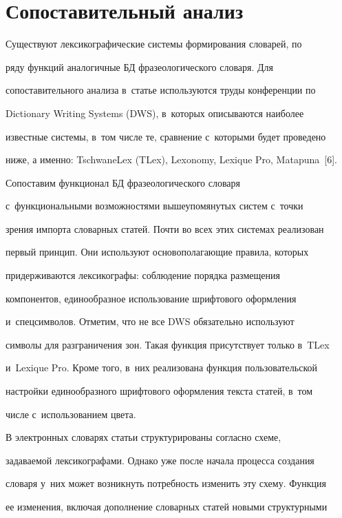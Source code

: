      

\section{Сопоставительный анализ}



   Существуют лексикографические системы формирования словарей, по 

ряду функций аналогичные БД фразеологического словаря. Для 

сопоставительного анализа в~статье используются труды конференции по 

Dictionary Writing Systems (DWS), в~которых описываются наиболее 

известные системы, в~том числе те, сравнение с~которыми будет проведено 

ниже, а именно: TschwaneLex (TLex), Lexonomy, Lexique Pro, Matapuna~[6]. 

   

   Сопоставим функционал БД фразеологического словаря 

с~функциональными возможностями вышеупомянутых систем с~точки 

зрения импорта словарных статей. Почти во всех этих системах реализован 

первый принцип. Они используют основополагающие правила, которых 

придерживаются лексикографы: соблюдение порядка размещения 

компонентов, единообразное использование шрифтового оформления 

и~спецсимволов. Отметим, что не все DWS обязательно используют 

символы для разграничения зон. Такая функция присутствует только в~TLex 

и~Lexique Pro. Кроме того, в~них реализована функция пользовательской 

настройки единообразного шрифтового оформления текста статей, в~том 

числе с~использованием цвета.

   

   В электронных словарях статьи структурированы согласно схеме, 

за\-да\-ва\-емой лексикографами. Однако уже после начала процесса создания 

словаря у~них может возникнуть потребность изменить эту схему. Функция 

ее изменения, включая дополнение словарных статей новыми структурными 


